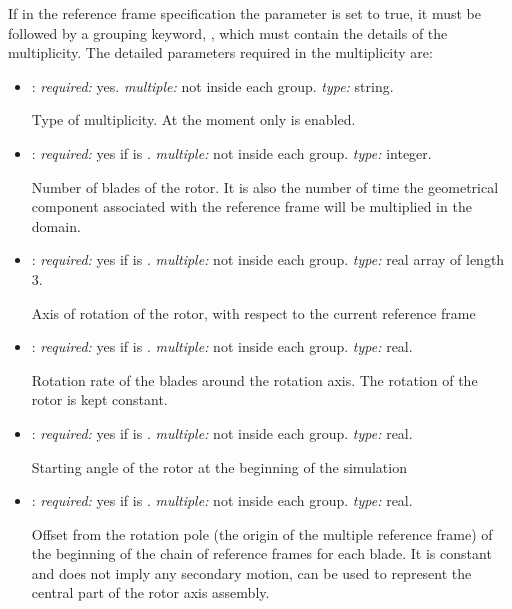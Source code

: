 If in the reference frame specification the parameter  is set to true, it must be followed by a grouping keyword, , which must contain the details of the multiplicity. The detailed parameters required in the multiplicity are:
\begin{itemize}
	\item {}: \textit{required:} yes. \textit{multiple:} not inside each  group. \textit{type:} string.
    
	Type of multiplicity. At the moment only  is enabled.
    
    \item {}: \textit{required:} yes if  is . \textit{multiple:} not inside each  group. \textit{type:} integer.
    
    Number of blades of the rotor. It is also the number of time the geometrical component associated with the reference frame will be multiplied in the domain. 
    
    \item {}: \textit{required:} yes if  is . \textit{multiple:} not inside each  group. \textit{type:} real array of length 3.
    
    Axis of rotation of the rotor, with respect to the current reference frame
    
    \item {}: \textit{required:} yes if  is . \textit{multiple:} not inside each  group. \textit{type:} real.
    
    Rotation rate of the blades around the rotation axis. The rotation of the rotor is kept constant.
    
    \item {}: \textit{required:} yes if  is . \textit{multiple:} not inside each  group. \textit{type:} real.
    
    Starting angle of the rotor at the beginning of the simulation
    
    \item {}: \textit{required:} yes if  is . \textit{multiple:} not inside each  group. \textit{type:} real. 
    
    Offset from the rotation pole (the origin of the multiple reference frame) of the beginning of the chain of reference frames for each blade. It is constant and does not imply any secondary motion, can be used to represent the central part of the rotor axis assembly. 
    

\end{itemize}

